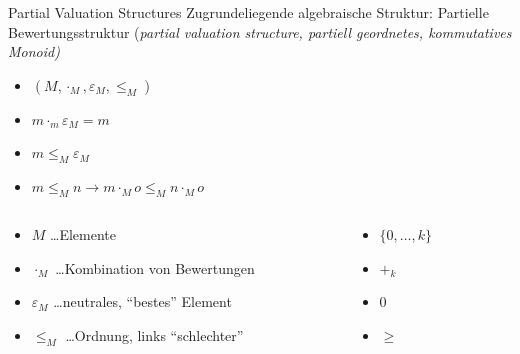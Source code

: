 \documentclass[handout,10pt,xcolor={dvipsnames},fleqn]{beamer}
\begin{document}
\begin{frame}{Partial Valuation Structures}
Zugrundeliegende \alert{algebraische Struktur}: Partielle Bewertungsstruktur (\emph{partial valuation structure, partiell geordnetes, kommutatives Monoid)}
\begin{itemize}
\item $(M, \cdot_M, \varepsilon_M, \leq_M)$ 
\item $m \cdot_m \varepsilon_M = m$
\item $m \leq_M \varepsilon_M$
\item $m \leq_M n \rightarrow m \cdot_M o \leq_M n \cdot_M o$
\end{itemize}
\vspace*{2ex}

\begin{columns}[onlytextwidth,T]
    
    \begin{column}{.7\textwidth}
          
    
    \begin{itemize}
    \item $M$ \ldots Elemente
    \item $\cdot_M$ \ldots Kombination von Bewertungen
    \item $\varepsilon_M$ \ldots neutrales, ``bestes'' Element
    \item $\leq_M$ \ldots Ordnung, links ``schlechter''
    \end{itemize}
    \end{column}
    
    \begin{column}{.3\textwidth}
  	 \begin{itemize}
    \item $\{0, \ldots, k \}$ 
    \item $+_k$
    \item $0$ 
    \item $\geq$
    \end{itemize}
    \end{column}
  \end{columns}

  \vspace*{2ex}
  
  \hfill \emph{\cite{Gadducci2013,SchiendorferPvs2015}}
\end{frame}
\end{document}
